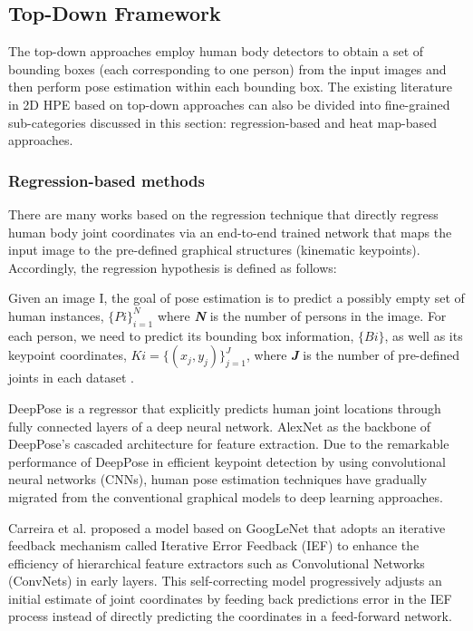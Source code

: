 \subsection{Top-Down Framework}

The top-down approaches employ human body detectors \cite{ren_faster_2016, micilotta_real-time_2006} to obtain a set of bounding boxes (each corresponding to one person) from the input images and then perform pose estimation within each bounding box. The existing literature in 2D HPE based on top-down approaches can also be divided into fine-grained sub-categories discussed in this section: regression-based and heat map-based approaches. 

\subsubsection{Regression-based methods}

There are many works based on the regression technique \cite{carreira_human_2016, fan_combining_2015, fieraru_learning_2018, li_heterogeneous_2014, qiu_peeking_2020, sun_compositional_2017, sun_integral_2018, toshev_deeppose_2014, wang_graph-pcnn_2020,z} that directly regress human body joint coordinates via an end-to-end trained network that maps the input image to the pre-defined graphical structures (kinematic keypoints). Accordingly, the regression hypothesis is defined as follows:

Given an image I, the goal of pose estimation is to predict a possibly empty set of human instances, $\{Pi\}_{i=1}^N$ where \textbf{\textit{N}} is the number of persons in the image. For each person, we need to predict its bounding box information, $\{Bi\}$, as well as its keypoint coordinates, $Ki=\{(x_j, y_j)\}_{j=1}^J$, where \textbf{\textit{J}} is the number of pre-defined joints in each dataset \cite{li_pose_2021}.

DeepPose \cite{toshev_deeppose_2014} is a regressor that explicitly predicts human joint locations through fully connected layers of a deep neural network. AlexNet \cite{krizhevsky_imagenet_2012} as the backbone of DeepPose's cascaded architecture for feature extraction. Due to the remarkable performance of DeepPose in efficient keypoint detection by using convolutional neural networks (CNNs), human pose estimation techniques have gradually migrated from the conventional graphical models to deep learning approaches. 

Carreira et al. \cite{carreira_human_2016} proposed a model based on GoogLeNet \cite{szegedy_going_2014} that adopts an iterative feedback mechanism called Iterative Error Feedback (IEF) to enhance the efficiency of hierarchical feature extractors such as Convolutional Networks (ConvNets) in early layers. This self-correcting model progressively adjusts an initial estimate of joint coordinates by feeding back predictions error in the IEF process instead of directly predicting the coordinates in a feed-forward network.

